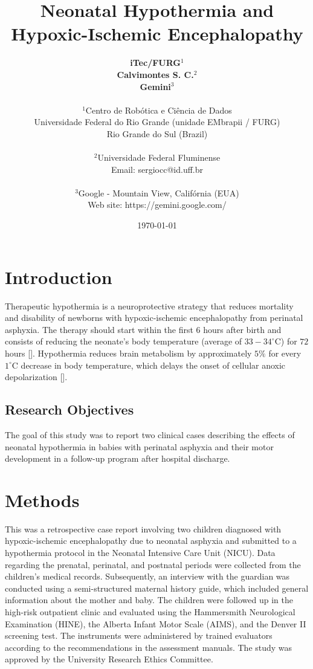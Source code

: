 \documentclass[11pt,a4paper]{article}
\title{\textbf{Neonatal Hypothermia and Hypoxic-Ischemic Encephalopathy}}
\author{
	\textbf{iTec/FURG}$^{1}$ \\
	\textbf{Calvimontes S. C.}$^{2}$ \\
	\textbf{Gemini}$^{3}$ \\
	\\
	\small $^{1}$Centro de Robótica e Ciência de Dados \\
	\small Universidade Federal do Rio Grande (unidade EMbrapii / FURG) \\
	\small Rio Grande do Sul (Brazil) \\
	\\
	\small $^{2}$Universidade Federal Fluminense \\
	\small Email: sergiocc@id.uff.br \\
	\\
	\small $^{3}$Google - Mountain View, Califórnia (EUA) \\
	\small Web site: https://gemini.google.com/
}
\date{\today}
\begin{document}
	
	\maketitle
	
	\newpage
	
	\section{Introduction}
	Therapeutic hypothermia is a neuroprotective strategy that reduces mortality and disability of newborns with hypoxic-ischemic encephalopathy from perinatal asphyxia. The therapy should start within the first 6 hours after birth and consists of reducing the neonate's body temperature (average of $33-34^{\circ}$C) for $72$ hours [\cite{Azzopardi2014, Thayyil2021, Abate2021}]. Hypothermia reduces brain metabolism by approximately $5\%$ for every $1^{\circ}$C decrease in body temperature, which delays the onset of cellular anoxic depolarization [\cite{Silveira2015}].
		
	\subsection{Research Objectives}
	The goal of this study was to report two clinical cases describing the effects of neonatal hypothermia in babies with perinatal asphyxia and their motor development in a follow-up program after hospital discharge.
	
	\section{Methods}
	This was a retrospective case report involving two children diagnosed with hypoxic-ischemic encephalopathy due to neonatal asphyxia and submitted to a hypothermia protocol in the Neonatal Intensive Care Unit (NICU). Data regarding the prenatal, perinatal, and postnatal periods were collected from the children's medical records. Subsequently, an interview with the guardian was conducted using a semi-structured maternal history guide, which included general information about the mother and baby. The children were followed up in the high-risk outpatient clinic and evaluated using the Hammersmith Neurological Examination (HINE), the Alberta Infant Motor Scale (AIMS), and the Denver II screening test. The instruments were administered by trained evaluators according to the recommendations in the assessment manuals. The study was approved by the University Research Ethics Committee.
	
\end{document}
